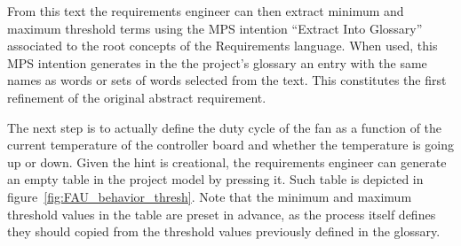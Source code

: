 From this text the requirements engineer can then
extract minimum and maximum threshold terms using the 
MPS intention ``Extract Into Glossary'' associated to the root concepts of the
\textsf{Requirements} language. When used, this MPS intention generates in the
the project's glossary an entry with the same names as words
or sets of words selected from the text. This constitutes the first refinement
of the original abstract requirement.


% 

The next step is to actually define the duty cycle of the fan as a function
of the current temperature of the controller board and whether the temperature
is going up or down. 
Given the hint is creational, the requirements engineer can generate an empty
table in the project model by pressing it. Such table is depicted in
figure~\ref{fig:FAU_behavior_thresh}.
Note that the minimum and maximum threshold values in the table are preset in
advance, as the process itself defines they should copied from the threshold values previously defined in the glossary.

